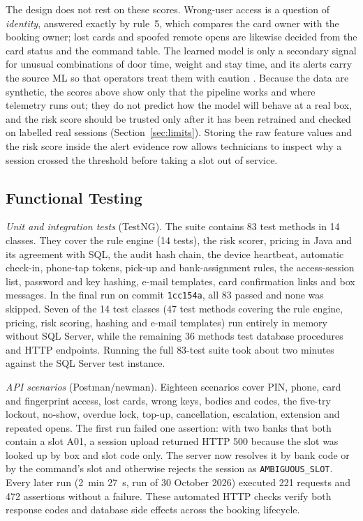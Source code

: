 \documentclass[journal,onecolumn]{IEEEtran}
\newcommand{\measurecommit}{1cc154a}
\begin{document}
The design does not rest on these scores. Wrong-user access is a question of \emph{identity}, answered exactly by
rule~5, which compares the card owner with the booking owner; lost cards and spoofed remote opens are likewise decided
from the card status and the command table. The learned model is only a secondary signal for unusual combinations of
door time, weight and stay time, and its alerts carry the source ML so that operators treat them with caution
\cite{sommer2010outside}. Because the data are synthetic, the scores above show only that the pipeline works and where
telemetry runs out; they do not predict how the model will behave at a real box, and the risk score should be trusted
only after it has been retrained and checked on labelled real sessions (Section~\ref{sec:limits}). Storing the raw
feature values and the risk score inside the alert evidence row allows technicians to inspect why a session crossed the
threshold before taking a slot out of service.

\subsection{Functional Testing}
\label{sec:functional}

\textit{Unit and integration tests} (TestNG). The suite contains 83 test methods in 14 classes. They cover the rule
engine (14 tests), the risk scorer, pricing in Java and its agreement with SQL, the audit hash chain, the device
heartbeat, automatic check-in, phone-tap tokens, pick-up and bank-assignment rules, the access-session list, password
and key hashing, e-mail templates, card confirmation links and box messages. In the final run on commit
\texttt{\measurecommit}, all 83 passed and none was skipped. Seven of the 14 test classes (47 test methods covering the
rule engine, pricing, risk scoring, hashing and e-mail templates) run entirely in memory without SQL Server, while the
remaining 36 methods test database procedures and HTTP endpoints. Running the full 83-test suite took about two minutes
against the SQL Server test instance.

\textit{API scenarios} (Postman/newman). Eighteen scenarios cover PIN, phone, card and fingerprint access, lost cards,
wrong keys, bodies and codes, the five-try lockout, no-show, overdue lock, top-up, cancellation, escalation, extension
and repeated opens. The first run failed one assertion: with two banks that both contain a slot A01, a session upload
returned HTTP 500 because the slot was looked up by box and slot code only. The server now resolves it by bank code or
by the command's slot and otherwise rejects the session as \texttt{AMBIGUOUS\_SLOT}. Every later run (2~min 27~s, run
of 30 October 2026) executed 221 requests and 472 assertions without a failure. These automated HTTP checks verify both
response codes and database side effects across the booking lifecycle.
\end{document}
